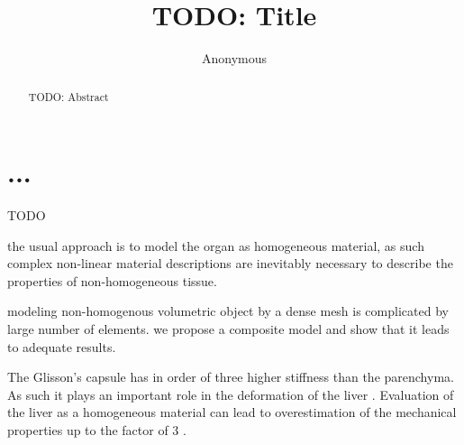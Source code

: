 \documentclass{llncs}
\begin{document}
%
%
\mainmatter              %
%
\title{TODO: Title} %
%
%
\author{Anonymous}
%
%
%
\maketitle

\begin{abstract}
TODO: Abstract
\end{abstract}

\section{...}

TODO



the usual approach is to model the organ as homogeneous material,
as such complex non-linear material descriptions are inevitably necessary
to describe the properties of non-homogeneous tissue.

modeling non-homogenous volumetric object by a dense mesh is complicated by
large number of elements. we propose a composite model and show that it
leads to adequate results.


The Glisson's capsule has in order of three higher
stiffness than the parenchyma. As such it plays an important role in the
deformation of the liver \cite{Ahn2010,Hollenstein2006}. Evaluation of the
liver as a homogeneous material can lead to overestimation of the
mechanical properties up to the factor of 3 \cite{Hollenstein2006}.
\end{document}
